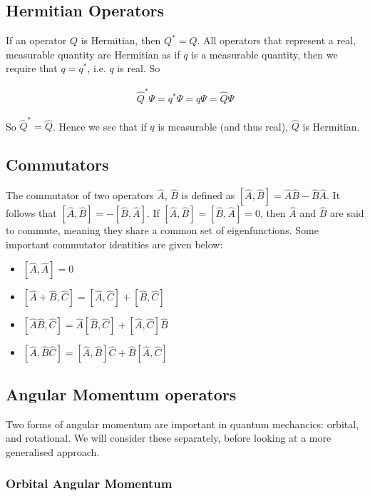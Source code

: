 \subsection{Hermitian Operators}

If an operator $Q$ is Hermitian, then $Q^* = Q$. All operators that represent a real, measurable quantity are Hermitian as if $q$ is a measurable quantity, then we require that $q = q^*$, i.e. $q$ is real. So

\begin{align*}
\hat{Q}^*\Psi = q^*\Psi = q\Psi = \hat{Q}\Psi
\end{align*}

So $\hat{Q}^* = \hat{Q}$. Hence we see that if $q$ is measurable (and thus real), $\hat{Q}$ is Hermitian.


\subsection{Commutators}

The commutator of two operators $\hat{A}$, $\hat{B}$ is defined as $[\hat{A},\hat{B}] = \hat{A}\hat{B} - \hat{B}\hat{A}$. It follows that $[\hat{A},\hat{B}] = -[\hat{B},\hat{A}]$. If $[\hat{A},\hat{B}] =[\hat{B},\hat{A}] = 0$, then $\hat{A}$ and $\hat{B}$ are said to commute, meaning they share a common set of eigenfunctions.  Some important commutator identities are given below:

\begin{itemize}
	\item $[\hat{A},\hat{A}] = 0$
	\item $[\hat{A} + \hat{B}, \hat{C}] = [\hat{A},\hat{C}] + [\hat{B},\hat{C}]$
	\item $[\hat{A}\hat{B},\hat{C}] = \hat{A}[\hat{B},\hat{C}] + [\hat{A},\hat{C}]\hat{B}$
	\item $[\hat{A},\hat{B}\hat{C}] = [\hat{A},\hat{B}]\hat{C} + \hat{B}[\hat{A},\hat{C}]$
\end{itemize}

\subsection{Angular Momentum operators}

Two forms of angular momentum are important in quantum mechancics: orbital, and rotational. We will consider these separately, before looking at a more generalised approach.

\subsubsection*{Orbital Angular Momentum}

